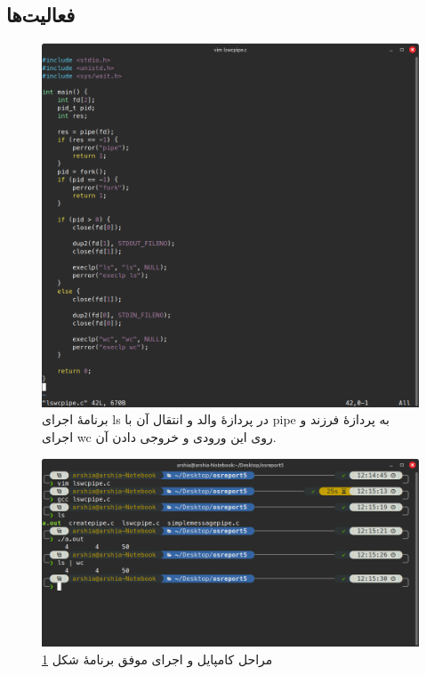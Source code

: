 \documentclass[12pt]{article}
\begin{document}
	\subsection{فعالیت‌ها}
	\begin{figure}[H]
		\centering
		\includegraphics[width=\textwidth]{report5-resources/6.png}
		\caption{برنامهٔ اجرای \textenglish{ls} در پردازهٔ والد و انتقال آن با \textenglish{pipe} به پردازهٔ فرزند و اجرای \textenglish{wc} روی این ورودی و خروجی دادن آن.}
		\label{img:6}
	\end{figure}
	\begin{figure}[H]
		\centering
		\includegraphics[width=\textwidth]{report5-resources/7.png}
		\caption{مراحل کامپایل و اجرای موفق برنامهٔ شکل \ref{img:6}}
		\label{img:7}
	\end{figure}
	
\end{document}
